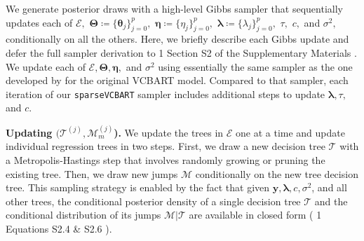 \documentclass[11pt]{article}
\newcommand{\calM}{\mathcal{M}}
\newcommand{\calT}{\mathcal{T}}
\newcommand{\bcalE}{\boldsymbol{\mathcal{E}}}
\newcommand{\by}{\bm{y}}
\newcommand{\btheta}{\boldsymbol{\theta}}
\newcommand{\blambda}{\boldsymbol{\lambda}}
\newcommand{\bTheta}{\boldsymbol{\Theta}}
\newcommand{\bEta}{\boldsymbol{\eta}}
\theoremstyle{plain}
\theoremstyle{definition}
\theoremstyle{plain}
\newcommand{\includesupp}{1}
\newcommand{\switchref}[2]{%
  \if\includesupp1%
    #1%
  \else%
    #2%
  \fi%
}
\begin{document}
We generate posterior draws with a high-level Gibbs sampler that sequentially updates each of $\bcalE,$ $\bTheta \coloneqq\{\btheta_j\}_{j=0}^{p},$ $\bEta \coloneqq \{\eta_j\}_{j=0}^{p},$ $\blambda \coloneqq \{\lambda_j\}_{j=0}^{p},$ $\tau,$ $c,$ and $\sigma^{2},$ conditionally on all the others. 
Here, we briefly describe each Gibbs update and defer the full sampler derivation to \switchref{}{Section S2 of the Supplementary Materials}.
We update each of $\bcalE, \bTheta, \bEta,$ and $\sigma^{2}$ using essentially the same sampler as the one developed by \citet{Deshpande2024} for the original VCBART model.
Compared to that sampler, each iteration of our \texttt{sparseVCBART} sampler includes additional steps to update $\blambda, \tau,$ and $c.$

\textbf{Updating $(\calT^{(j)}, \calM^{(j)}_{m}$).} 
We update the trees in $\bcalE$ one at a time and update individual regression trees in two steps.
First, we draw a new decision tree $\calT$ with a Metropolis-Hastings step that involves randomly growing or pruning the existing tree.
Then, we draw new jumps $\calM$ conditionally on the new tree decision tree.
This sampling strategy is enabled by the fact that given $\by, \blambda, c, \sigma^{2}$, and all other trees, the conditional posterior density of a single decision tree $\calT$ and the conditional distribution of its jumps $\calM \vert \calT$ are available in closed form (\switchref{}{Equations S2.4 \& S2.6}).
\end{document}
